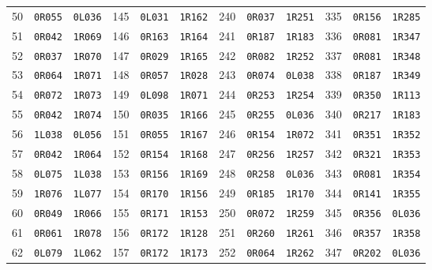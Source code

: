 \documentclass[11pt,letterpaper]{article}
\begin{document}
\begin{longtable}{@{}rll@{\qquad}rll@{\qquad}rll@{\qquad}rll@{}}
50 & \texttt{0R055} & \texttt{0L036} & 145 & \texttt{0L031} & \texttt{1R162} & 240 & \texttt{0R037} & \texttt{1R251} & 335 & \texttt{0R156} & \texttt{1R285} \\
51 & \texttt{0R042} & \texttt{1R069} & 146 & \texttt{0R163} & \texttt{1R164} & 241 & \texttt{0R187} & \texttt{1R183} & 336 & \texttt{0R081} & \texttt{1R347} \\
52 & \texttt{0R037} & \texttt{1R070} & 147 & \texttt{0R029} & \texttt{1R165} & 242 & \texttt{0R082} & \texttt{1R252} & 337 & \texttt{0R081} & \texttt{1R348} \\
53 & \texttt{0R064} & \texttt{1R071} & 148 & \texttt{0R057} & \texttt{1R028} & 243 & \texttt{0R074} & \texttt{0L038} & 338 & \texttt{0R187} & \texttt{1R349} \\
54 & \texttt{0R072} & \texttt{1R073} & 149 & \texttt{0L098} & \texttt{1R071} & 244 & \texttt{0R253} & \texttt{1R254} & 339 & \texttt{0R350} & \texttt{1R113} \\
55 & \texttt{0R042} & \texttt{1R074} & 150 & \texttt{0R035} & \texttt{1R166} & 245 & \texttt{0R255} & \texttt{0L036} & 340 & \texttt{0R217} & \texttt{1R183} \\
56 & \texttt{1L038} & \texttt{0L056} & 151 & \texttt{0R055} & \texttt{1R167} & 246 & \texttt{0R154} & \texttt{1R072} & 341 & \texttt{0R351} & \texttt{1R352} \\
57 & \texttt{0R042} & \texttt{1R064} & 152 & \texttt{0R154} & \texttt{1R168} & 247 & \texttt{0R256} & \texttt{1R257} & 342 & \texttt{0R321} & \texttt{1R353} \\
58 & \texttt{0L075} & \texttt{1L038} & 153 & \texttt{0R156} & \texttt{1R169} & 248 & \texttt{0R258} & \texttt{0L036} & 343 & \texttt{0R081} & \texttt{1R354} \\
59 & \texttt{1R076} & \texttt{1L077} & 154 & \texttt{0R170} & \texttt{1R156} & 249 & \texttt{0R185} & \texttt{1R170} & 344 & \texttt{0R141} & \texttt{1R355} \\
60 & \texttt{0R049} & \texttt{1R066} & 155 & \texttt{0R171} & \texttt{1R153} & 250 & \texttt{0R072} & \texttt{1R259} & 345 & \texttt{0R356} & \texttt{0L036} \\
61 & \texttt{0R061} & \texttt{1R078} & 156 & \texttt{0R172} & \texttt{1R128} & 251 & \texttt{0R260} & \texttt{1R261} & 346 & \texttt{0R357} & \texttt{1R358} \\
62 & \texttt{0L079} & \texttt{1L062} & 157 & \texttt{0R172} & \texttt{1R173} & 252 & \texttt{0R064} & \texttt{1R262} & 347 & \texttt{0R202} & \texttt{0L036} \\

\end{longtable}
\end{document}
